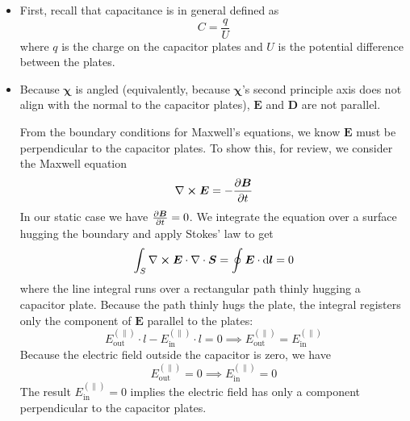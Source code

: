 \documentclass[11pt, a4paper]{article}
\newcommand{\diff}{\mathop{}\!\mathrm{d}} %
\renewcommand{\vec}[1]{\bm{#1}} %
\newcommand{\E}{\vec{E}}  %
\newcommand{\D}{\vec{D}}  %
\newcommand{\B}{\vec{B}}  %
\newcommand{\eee}{\bm{\chi}}  %
\renewcommand{\div}{\nabla \cdot}
\renewcommand{\curl}{\nabla \cross}
\begin{document}

\begin{itemize}
	\item First, recall that capacitance is in general defined as
	\begin{equation*}
		C = \frac{q}{U}
	\end{equation*}
	where $ q $ is the charge on the capacitor plates and $ U $ is the potential difference between the plates.
	
	\item Because $ \eee $ is angled (equivalently, because $ \eee $'s second principle axis does not align with the normal to the capacitor plates), $ \E $ and $ \D $ are not parallel. 
	
	From the boundary conditions for Maxwell's equations, we know $ \E $ must be perpendicular to the capacitor plates. To show this, for review, we consider the Maxwell equation
	\begin{equation*}
		\curl \E = - \pdv{\B}{t} 
	\end{equation*}
	In our static case we have $ \pdv{\B}{t} = 0 $. We integrate the equation over a surface hugging the boundary and apply Stokes' law to get 
	\begin{equation*}
		\int_{S}\curl \E \cdot \div \vec{S} = \oint \E \cdot \diff \vec{l} = 0
	\end{equation*}
	where the line integral runs over a rectangular path thinly hugging a capacitor plate. Because the path thinly hugs the plate, the integral registers only the component of $ \E $ parallel to the plates:
	\begin{equation*}
		E_{\text{out}}^{(\parallel)}\cdot l - E_{\text{in}}^{(\parallel)} \cdot l = 0 \implies E_{\text{out}}^{(\parallel)} = E_{\text{in}}^{(\parallel)}
	\end{equation*}
	Because the electric field outside the capacitor is zero, we have
	\begin{equation*}
		E_{\text{out}}^{(\parallel)} = 0 \implies E_{\text{in}}^{(\parallel)} = 0
	\end{equation*}
	The result $ E_{\text{in}}^{(\parallel)} = 0 $ implies the electric field has only a component perpendicular to the capacitor plates. 
	

\end{itemize}
\end{document}
